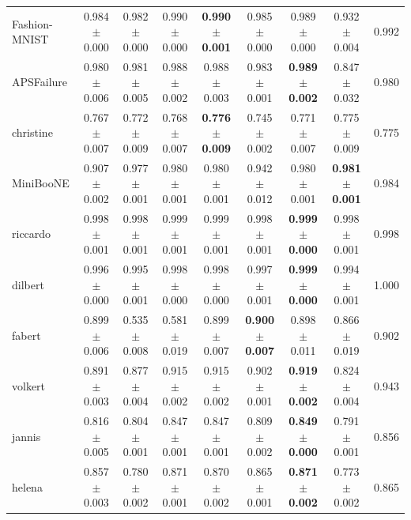 \begin{tabular}{lcccccccc}
Fashion-MNIST & 0.984{\tiny$\pm$0.000} & 0.982{\tiny$\pm$0.000} & 0.990{\tiny$\pm$0.000} & \textbf{0.990{\tiny$\pm$0.001}} & 0.985{\tiny$\pm$0.000} & 0.989{\tiny$\pm$0.000} & 0.932{\tiny$\pm$0.004} & 0.992 \\
APSFailure & 0.980{\tiny$\pm$0.006} & 0.981{\tiny$\pm$0.005} & 0.988{\tiny$\pm$0.002} & 0.988{\tiny$\pm$0.003} & 0.983{\tiny$\pm$0.001} & \textbf{0.989{\tiny$\pm$0.002}} & 0.847{\tiny$\pm$0.032} & 0.980 \\
christine & 0.767{\tiny$\pm$0.007} & 0.772{\tiny$\pm$0.009} & 0.768{\tiny$\pm$0.007} & \textbf{0.776{\tiny$\pm$0.009}} & 0.745{\tiny$\pm$0.002} & 0.771{\tiny$\pm$0.007} & 0.775{\tiny$\pm$0.009} & 0.775 \\
MiniBooNE & 0.907{\tiny$\pm$0.002} & 0.977{\tiny$\pm$0.001} & 0.980{\tiny$\pm$0.001} & 0.980{\tiny$\pm$0.001} & 0.942{\tiny$\pm$0.012} & 0.980{\tiny$\pm$0.001} & \textbf{0.981{\tiny$\pm$0.001}} & 0.984 \\
riccardo & 0.998{\tiny$\pm$0.001} & 0.998{\tiny$\pm$0.001} & 0.999{\tiny$\pm$0.001} & 0.999{\tiny$\pm$0.001} & 0.998{\tiny$\pm$0.001} & \textbf{0.999{\tiny$\pm$0.000}} & 0.998{\tiny$\pm$0.001} & 0.998 \\
dilbert & 0.996{\tiny$\pm$0.000} & 0.995{\tiny$\pm$0.001} & 0.998{\tiny$\pm$0.000} & 0.998{\tiny$\pm$0.000} & 0.997{\tiny$\pm$0.001} & \textbf{0.999{\tiny$\pm$0.000}} & 0.994{\tiny$\pm$0.001} & 1.000 \\
fabert & 0.899{\tiny$\pm$0.006} & 0.535{\tiny$\pm$0.008} & 0.581{\tiny$\pm$0.019} & 0.899{\tiny$\pm$0.007} & \textbf{0.900{\tiny$\pm$0.007}} & 0.898{\tiny$\pm$0.011} & 0.866{\tiny$\pm$0.019} & 0.902 \\
volkert & 0.891{\tiny$\pm$0.003} & 0.877{\tiny$\pm$0.004} & 0.915{\tiny$\pm$0.002} & 0.915{\tiny$\pm$0.002} & 0.902{\tiny$\pm$0.001} & \textbf{0.919{\tiny$\pm$0.002}} & 0.824{\tiny$\pm$0.004} & 0.943 \\
jannis & 0.816{\tiny$\pm$0.005} & 0.804{\tiny$\pm$0.001} & 0.847{\tiny$\pm$0.001} & 0.847{\tiny$\pm$0.001} & 0.809{\tiny$\pm$0.002} & \textbf{0.849{\tiny$\pm$0.000}} & 0.791{\tiny$\pm$0.001} & 0.856 \\
helena & 0.857{\tiny$\pm$0.003} & 0.780{\tiny$\pm$0.002} & 0.871{\tiny$\pm$0.001} & 0.870{\tiny$\pm$0.002} & 0.865{\tiny$\pm$0.001} & \textbf{0.871{\tiny$\pm$0.002}} & 0.773{\tiny$\pm$0.002} & 0.865 \\
\bottomrule
\end{tabular}
